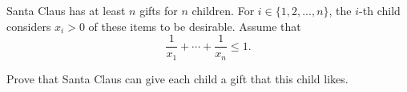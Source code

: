 Santa Claus has at least $n$ gifts for $n$ children. For $i\in\{1,2, ... , n\}$,  the $i$-th child considers $x_i > 0$ of these items to be desirable. Assume that\[\dfrac{1}{x_1}+\cdots+\dfrac{1}{x_n}\le1.\]

Prove that Santa Claus can give each child a gift that this child likes.